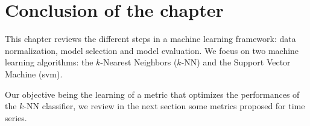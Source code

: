 


\section{Conclusion of the chapter}
This chapter reviews the different steps in a machine learning framework: data normalization, model selection and model evaluation. We focus on two machine learning algorithms: the $k$-Nearest Neighbors ($k$-NN) and the Support Vector Machine ({\sc svm}).  

Our objective being the learning of a metric that optimizes the performances of the $k$-NN classifier, we review in the next section some metrics proposed for time series.

